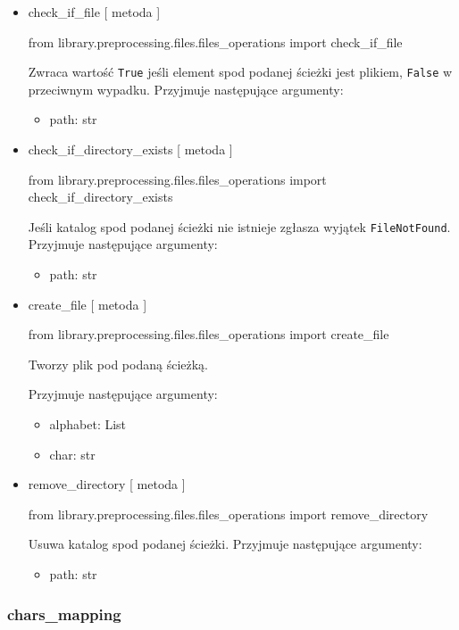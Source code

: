\begin{itemize}
\item{check\_if\_file [ metoda ] }
\begin{import}
from library.preprocessing.files.files_operations import check_if_file
\end{import}
Zwraca wartość \texttt{True} jeśli element spod podanej ścieżki jest plikiem, \texttt{False} w przeciwnym wypadku.
Przyjmuje następujące argumenty:
\begin{itemize}
	\item path: str
\end{itemize}

\item{check\_if\_directory\_exists [ metoda ] }
\begin{import}
from library.preprocessing.files.files_operations import check_if_directory_exists
\end{import}
Jeśli katalog spod podanej ścieżki nie istnieje zgłasza wyjątek \texttt{FileNotFound}.
Przyjmuje następujące argumenty:
\begin{itemize}
	\item path: str
\end{itemize}

\item{create\_file [ metoda ] }
\begin{import}
from library.preprocessing.files.files_operations import create_file
\end{import}
Tworzy plik pod podaną ścieżką. 

Przyjmuje następujące argumenty:
\begin{itemize}
	\item alphabet: List
	\item char: str
\end{itemize}

\item{remove\_directory [ metoda ] }
\begin{import}
from library.preprocessing.files.files_operations import remove_directory
\end{import}

Usuwa katalog spod podanej ścieżki.
Przyjmuje następujące argumenty:
\begin{itemize}
	\item path: str
\end{itemize}

\end{itemize}

\newpage

\subsubsection{chars\_mapping}

